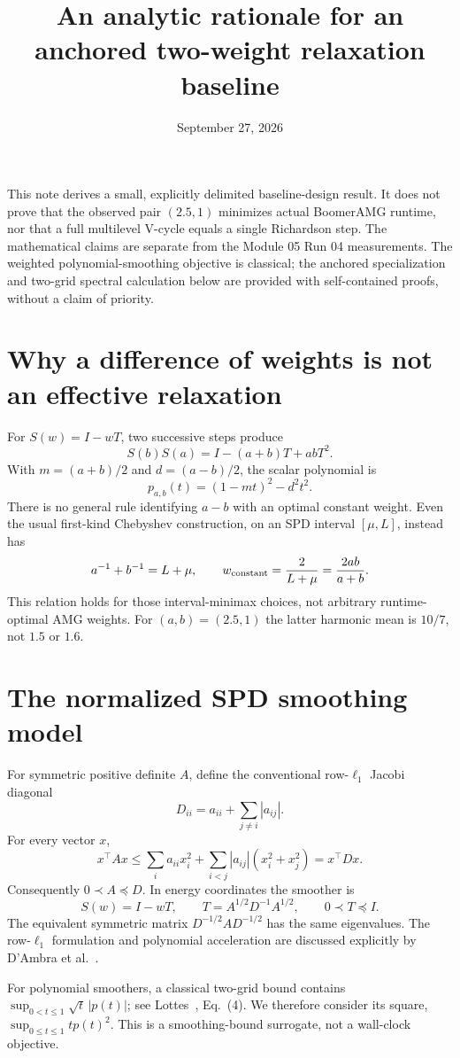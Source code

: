 \documentclass[11pt]{article}
\title{An analytic rationale for an anchored two-weight relaxation baseline}
\author{}
\date{September 27, 2026}
\begin{document}
\maketitle
\noindent
This note derives a small, explicitly delimited baseline-design result. It
does not prove that the observed pair $(2.5,1)$ minimizes actual BoomerAMG
runtime, nor that a full multilevel V-cycle equals a single Richardson step.
The mathematical claims are separate from the Module 05 Run 04 measurements. The weighted polynomial-smoothing
objective is classical; the anchored specialization and two-grid spectral
calculation below are provided with self-contained proofs, without a claim
of priority.

\section{Why a difference of weights is not an effective relaxation}
For $S(w)=I-wT$, two successive steps produce
\[
 S(b)S(a)=I-(a+b)T+abT^2.
\]
With $m=(a+b)/2$ and $d=(a-b)/2$, the scalar polynomial is
\[
 p_{a,b}(t)=(1-mt)^2-d^2t^2.
\]
There is no general rule identifying $a-b$ with an optimal constant weight.
Even the usual first-kind Chebyshev construction, on an SPD interval
$[\mu,L]$, instead has
\[
 a^{-1}+b^{-1}=L+\mu,\qquad
 w_{\rm constant}=\frac{2}{L+\mu}=\frac{2ab}{a+b}.
\]
This relation holds for those interval-minimax choices, not arbitrary
runtime-optimal AMG weights. For $(a,b)=(2.5,1)$ the latter harmonic mean
is $10/7$, not $1.5$ or $1.6$.

\section{The normalized SPD smoothing model}
For symmetric positive definite $A$, define the conventional row-$\ell_1$
Jacobi diagonal
\[
 D_{ii}=a_{ii}+\sum_{j\ne i}|a_{ij}|.
\]
For every vector $x$,
\[
 x^\top Ax
 \le \sum_i a_{ii}x_i^2+
       \sum_{i<j}|a_{ij}|(x_i^2+x_j^2)
 =x^\top Dx.
\]
Consequently $0\prec A\preceq D$. In energy coordinates the smoother is
\[
 S(w)=I-wT,\qquad T=A^{1/2}D^{-1}A^{1/2},\qquad0\prec T\preceq I.
\]
The equivalent symmetric matrix $D^{-1/2}AD^{-1/2}$ has the same
eigenvalues. The row-$\ell_1$ formulation and polynomial acceleration are
discussed explicitly by D'Ambra et al.~\cite{dambra}.

For polynomial smoothers, a classical two-grid bound contains
$\sup_{0<t\le1}\sqrt t\,|p(t)|$; see Lottes~\cite{lottes}, Eq.~(4).
We therefore consider its square, $\sup_{0\le t\le1}t p(t)^2$.
This is a smoothing-bound surrogate, not a wall-clock objective.
\end{document}
